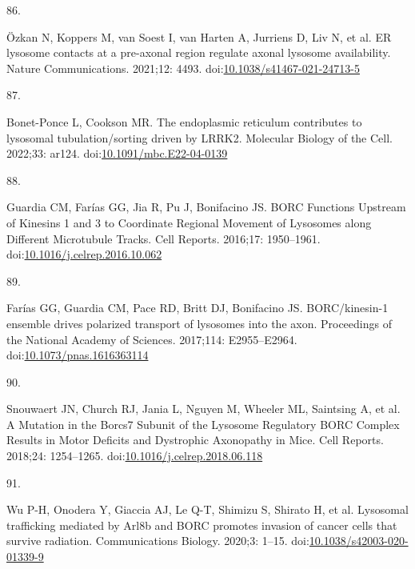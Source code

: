 \documentclass[
  12pt,
  a4paper,
]{book}
\newlength{\cslhangindent}
\newlength{\csllabelwidth}
\newlength{\cslentryspacingunit} %
\newenvironment{CSLReferences}[2] %
 {%
  \setlength{\parindent}{0pt}
  \ifodd #1
  \let\oldpar\par
  \def\par{\hangindent=\cslhangindent\oldpar}
  \fi
  \setlength{\parskip}{#2\cslentryspacingunit}
 }%
 {}
\newcommand{\CSLLeftMargin}[1]{\parbox[t]{\csllabelwidth}{#1}}
\newcommand{\CSLRightInline}[1]{\parbox[t]{\linewidth - \csllabelwidth}{#1}\break}
\begin{document}
\begin{CSLReferences}{0}{0}
\leavevmode{}%
\CSLLeftMargin{86. }%
\CSLRightInline{Özkan N, Koppers M, van Soest I, van Harten A, Jurriens D, Liv N, et al. {ER} \textendash{} lysosome contacts at a pre-axonal region regulate axonal lysosome availability. Nature Communications. 2021;12: 4493. doi:\href{https://doi.org/10.1038/s41467-021-24713-5}{10.1038/s41467-021-24713-5}}

\leavevmode{}%
\CSLLeftMargin{87. }%
\CSLRightInline{Bonet-Ponce L, Cookson MR. The endoplasmic reticulum contributes to lysosomal tubulation/sorting driven by {LRRK2}. Molecular Biology of the Cell. 2022;33: ar124. doi:\href{https://doi.org/10.1091/mbc.E22-04-0139}{10.1091/mbc.E22-04-0139}}

\leavevmode{}%
\CSLLeftMargin{88. }%
\CSLRightInline{Guardia CM, Farías GG, Jia R, Pu J, Bonifacino JS. {BORC Functions Upstream} of {Kinesins} 1 and 3 to {Coordinate Regional Movement} of {Lysosomes} along {Different Microtubule Tracks}. Cell Reports. 2016;17: 1950--1961. doi:\href{https://doi.org/10.1016/j.celrep.2016.10.062}{10.1016/j.celrep.2016.10.062}}

\leavevmode{}%
\CSLLeftMargin{89. }%
\CSLRightInline{Farías GG, Guardia CM, Pace RD, Britt DJ, Bonifacino JS. {BORC}/kinesin-1 ensemble drives polarized transport of lysosomes into the axon. Proceedings of the National Academy of Sciences. 2017;114: E2955--E2964. doi:\href{https://doi.org/10.1073/pnas.1616363114}{10.1073/pnas.1616363114}}

\leavevmode{}%
\CSLLeftMargin{90. }%
\CSLRightInline{Snouwaert JN, Church RJ, Jania L, Nguyen M, Wheeler ML, Saintsing A, et al. A {Mutation} in the {Borcs7 Subunit} of the {Lysosome Regulatory BORC Complex Results} in {Motor Deficits} and {Dystrophic Axonopathy} in {Mice}. Cell Reports. 2018;24: 1254--1265. doi:\href{https://doi.org/10.1016/j.celrep.2018.06.118}{10.1016/j.celrep.2018.06.118}}

\leavevmode{}%
\CSLLeftMargin{91. }%
\CSLRightInline{Wu P-H, Onodera Y, Giaccia AJ, Le Q-T, Shimizu S, Shirato H, et al. Lysosomal trafficking mediated by {Arl8b} and {BORC} promotes invasion of cancer cells that survive radiation. Communications Biology. 2020;3: 1--15. doi:\href{https://doi.org/10.1038/s42003-020-01339-9}{10.1038/s42003-020-01339-9}}


\end{CSLReferences}
\end{document}
